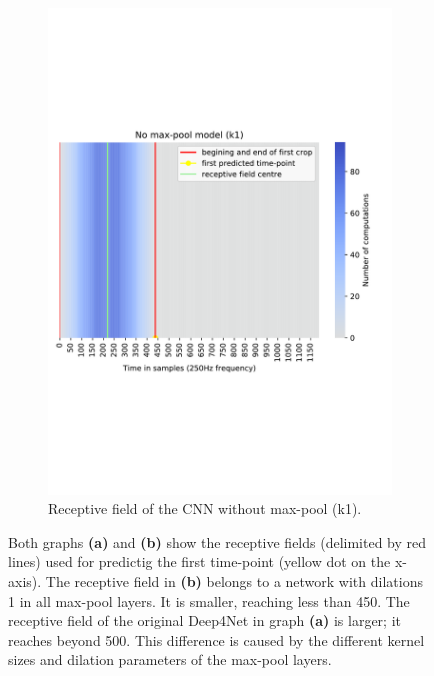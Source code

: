 \begin{figure}[!htpb]
\begin{subfigure}[b]{0.44\textwidth}
   \includegraphics[width=\linewidth]{img/ch3/k1-receptive-field}
   \caption{Receptive field of the CNN without max-pool (k1).}
\end{subfigure}
\caption[Receptive field comparison]{Both graphs \textbf{(a)} and \textbf{(b)} show the receptive fields (delimited by red lines) used for predictig the first time-point (yellow dot on the x-axis).
The receptive field in \textbf{(b)} belongs to a network with dilations 1 in all max-pool layers. It is smaller, reaching less than 450. The receptive field of the original Deep4Net in graph \textbf{(a)} is larger; it reaches beyond 500. This difference is caused by the different kernel sizes and dilation parameters of the max-pool layers.}
\label{fig:receptive-field-comparison}
\end{figure}

